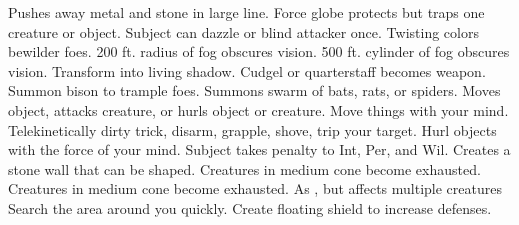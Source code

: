     {Pushes away metal and stone in large line.}
    {Force globe protects but traps one creature or object.}
    {Subject can dazzle or blind attacker once.}
    {Twisting colors bewilder foes.}
    {200 ft. radius of fog obscures vision.}
    {500 ft. cylinder of fog obscures vision.}
    {Transform into living shadow.}
    {Cudgel or quarterstaff becomes  weapon.}
    {Summon bison to trample foes.}
    {Summons swarm of bats, rats, or spiders.}
    {Moves object, attacks creature, or hurls object or creature.}
    {Move things with your mind.}
    {Telekinetically dirty trick, disarm, grapple, shove, trip your target.}
    {Hurl objects with the force of your mind.}
    {Subject takes  penalty to Int, Per, and Wil.}
    {Creates a stone wall that can be shaped.}
    {Creatures in medium cone become exhausted.}
    {Creatures in medium cone become exhausted.}
    {As , but affects multiple creatures}
    {Search the area around you quickly.}
    {Create floating shield to increase defenses.}
